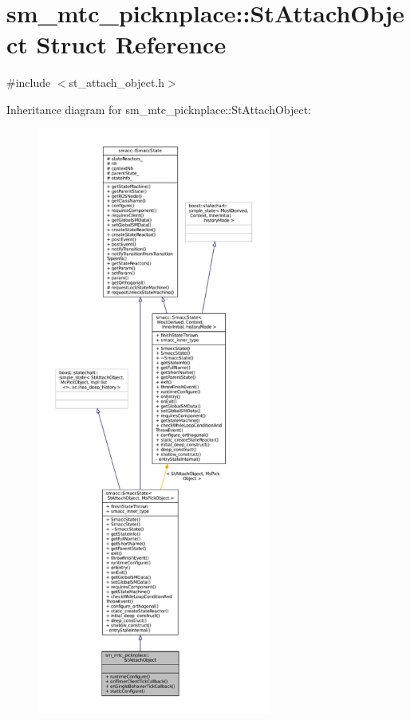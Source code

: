 \hypertarget{structsm__mtc__picknplace_1_1StAttachObject}{}\section{sm\+\_\+mtc\+\_\+picknplace\+:\+:St\+Attach\+Object Struct Reference}
\label{structsm__mtc__picknplace_1_1StAttachObject}


{\ttfamily \#include $<$st\+\_\+attach\+\_\+object.\+h$>$}



Inheritance diagram for sm\+\_\+mtc\+\_\+picknplace\+:\+:St\+Attach\+Object\+:
\nopagebreak
\begin{figure}[H]
\begin{center}
\leavevmode
\includegraphics[height=550pt]{structsm__mtc__picknplace_1_1StAttachObject__inherit__graph}
\end{center}
\end{figure}


